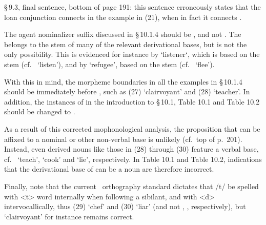 \documentclass[a4paper,11pt]{scrartcl}
\begin{document}

§\,9.3, final sentence, bottom of page 191: this sentence erroneously states that the loan conjunction  connects  in the example in (21), when in fact it connects . 

\pagebreak


The agent nominalizer suffix discussed in §\,10.1.4 should be , and not . The  belongs to the stem of many of the relevant derivational bases, but is not the only possibility. This is evidenced for instance by  ‘listener‘, which is based on the stem  (cf.~ ‘listen’), and by  ‘refugee’, based on the stem  (cf.~ ‘flee’). 

With this in mind, the morpheme boundaries in all the examples in §\,10.1.4 should be immediately before , such as (27)  ‘clairvoyant’ and (28)  ‘teacher’. 
In addition, the instances of  in the introduction to §\,10.1, Table 10.1 and Table 10.2 should be changed to . 

As a result of this corrected mophonological analysis, the proposition that  can be affixed to a nominal or other non-verbal base is unlikely (cf.~top of p.~201). 
Instead, even derived nouns like those in (28) through (30) feature a verbal base, cf.~ ‘teach’,  ‘cook’ and  ‘lie’, respectively. 
In Table 10.1 and Table 10.2, indications that the derivational base of  can be a noun are therefore incorrect. 

Finally, note that the current \PS\ orthography standard dictates that /t/ be spelled with <t> word internally when following a sibilant, and with <d> intervocallically, thus (29)  ‘chef’ and (30)  ‘liar’ (and not , , respectively), but  ‘clairvoyant’ for instance remains correct. 



%

%
\end{document}
